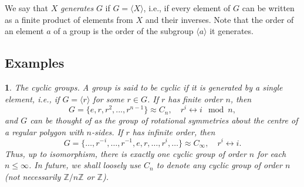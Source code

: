 \documentclass[a4paper,11pt,final]{memoir}%
\newtheorem{plain}[X]{}
\theoremstyle{nonumberplain}
\begin{document}
We say that $X$ \emph{generates}%
$G$ if $G=\langle X\rangle$, i.e., if every element of $G$ can be written as a
finite product of elements from $X$ and their inverses. Note that the order of
an element $a$ of a group is the order of the subgroup $\langle a\rangle$ it generates.

\subsection{Examples}

\begin{plain}
\label{bd8a}\emph{The cyclic groups. }A group is said to be \emph{cyclic}%
%
\emph{\/} if it is generated by a single element, i.e., if $G=\langle
r\rangle$ for some $r\in G$. If $r$ has finite order $n$, then
\[
G=\{e,r,r^{2},...,r^{n-1}\}\approx C_{n},\quad r^{i}\leftrightarrow i\mod n,
\]
and $G$ can be thought of as the group of rotational symmetries about the
centre of a regular polygon with $n$-sides. If $r$ has infinite order, then
\[
G=\{\ldots,r^{-}{}^{i},\ldots,r^{-1},e,r,\ldots,r^{i},\ldots\}\approx
C_{\infty},\quad r^{i}\leftrightarrow i.
\]
Thus, up to isomorphism, there is exactly one cyclic group of order $n$ for
each $n\leq\infty$. In future, we shall loosely use $C_{n}$ to denote any
cyclic group of order $n$ (not necessarily $\mathbb{Z}{}/n\mathbb{Z}{}$ or
$\mathbb{Z}{}$).
\end{plain}
\end{document}
